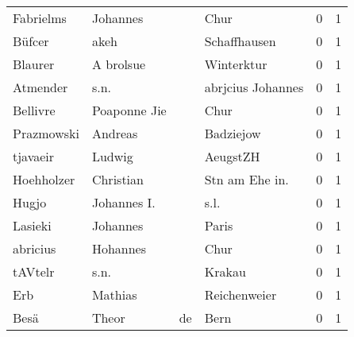 \documentclass[10pt,a4paper,landscape]{article}
\begin{document}
\begin{longtable}{llllrr}
                Fabrielms &                           Johannes &             &                                        Chur &          0 &         1 \\
                   Büfcer &                               akeh &             &                                Schaffhausen &          0 &         1 \\
                  Blaurer &                          A brolsue &             &                                  Winterktur &          0 &         1 \\
                 Atmender &                               s.n. &             &                           abrjcius Johannes &          0 &         1 \\
                 Bellivre &                       Poaponne Jie &             &                                        Chur &          0 &         1 \\
               Prazmowski &                            Andreas &             &                                   Badziejow &          0 &         1 \\
                 tjavaeir &                             Ludwig &             &                                    AeugstZH &          0 &         1 \\
               Hoehholzer &                          Christian &             &                             Stn am Ehe in.  &          0 &         1 \\
                    Hugjo &                        Johannes I. &             &                                        s.l. &          0 &         1 \\
                  Lasieki &                           Johannes &             &                                       Paris &          0 &         1 \\
                 abricius &                           Hohannes &             &                                        Chur &          0 &         1 \\
                  tAVtelr &                               s.n. &             &                                      Krakau &          0 &         1 \\
                      Erb &                            Mathias &             &                                Reichenweier &          0 &         1 \\
                     Besä &                              Theor &          de &                                        Bern &          0 &         1 \\

\end{longtable}
\end{document}
